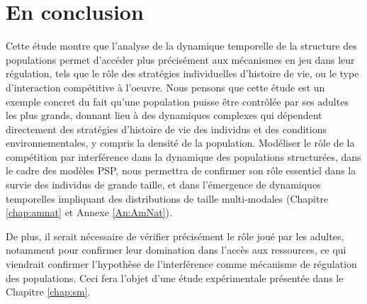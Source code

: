 \section{En conclusion}

Cette étude montre que l'analyse de la dynamique temporelle de la
structure des populations permet d'accéder plus précisément aux mécanismes en
jeu dans leur régulation, tels que le rôle des stratégies individuelles
d'histoire de vie, ou le type d'interaction compétitive à l'oeuvre. Nous pensons
que cette étude est un exemple concret du fait qu'une population puisse être
contrôlée par ses adultes les plus grands, donnant lieu à des dynamiques
complexes qui dépendent directement des stratégies d'histoire de vie des
individus et des conditions environnementales, y compris la densité de
la population.
Modéliser le rôle de la compétition par interférence dans la dynamique des populations structurées, dans le cadre des modèles PSP, nous
permettra de confirmer son rôle essentiel dans la survie des
individus de grande taille, et dans l'émergence de dynamiques temporelles
impliquant des distributions de taille multi-modales (Chapitre
\ref{chap:amnat} et Annexe \ref{An:AmNat}).

De plus, il serait nécessaire de vérifier précisément le rôle joué par les
adultes, notamment pour confirmer leur domination dans l'accès aux ressources,
ce qui viendrait confirmer l'hypothèse de l'interférence comme mécanisme de
régulation des populations. Ceci fera l'objet d'une étude expérimentale
présentée dans le Chapitre \ref{chap:sm}.


